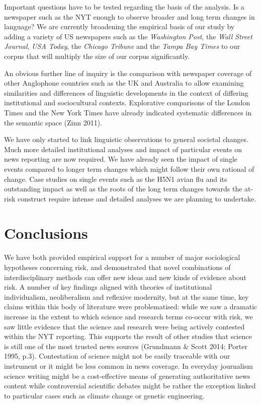 Important questions have to be tested regarding the basis of the analysis. Is a newspaper such as the NYT enough to observe broader and long term changes in language? We are currently broadening the empirical basis of our study by adding a variety of US newspapers such as the \emph{Washington Post}, the \emph{Wall Street Journal}, \emph{USA Today}, the \emph{Chicago Tribune} and the \emph{Tampa Bay Times} to our corpus that will multiply the size of our corpus significantly.

An obvious further line of inquiry is the comparison with newspaper coverage of other Anglophone countries such as the UK and Australia to allow examining similarities and differences of linguistic developments in the context of differing institutional and sociocultural contexts. Explorative comparisons of the London Times and the New York Times have already indicated systematic differences in the semantic space (Zinn 2011).

We have only started to link linguistic observations to general societal changes. Much more detailed institutional analyses and impact of particular events on news reporting are now required. We have already seen the impact of single events compared to longer term changes which might follow their own rational of change. Case studies on single events such as the H5N1 avian flu and its outstanding impact as well as the roots of the long term changes towards the at-risk construct require intense and detailed analyses we are planning to undertake.

\section{Conclusions}

We have both provided empirical support for a number of major sociological hypotheses concerning risk, and demonstrated that novel combinations of interdisciplinary methods can offer new ideas and new kinds of evidence about risk. A number of key findings aligned with theories of institutional individualism, neoliberalism and reflexive modernity, but at the same time, key claims within this body of literature were problematised: while we saw a dramatic increase in the extent to which science and research terms co-occur with risk, we saw little evidence that the science and research were being actively contested within the NYT reporting. This supports the result of other studies that science is still one of the most trusted news sources (Grundmann \& Scott 2014; Porter 1995, p.3). Contestation of science might not be easily traceable with our instrument or it might be less common in news coverage. In everyday journalism science writing might be a cost-effective means of generating authoritative news content while controversial scientific debates might be rather the exception linked to particular cases such as climate change or genetic engineering.

